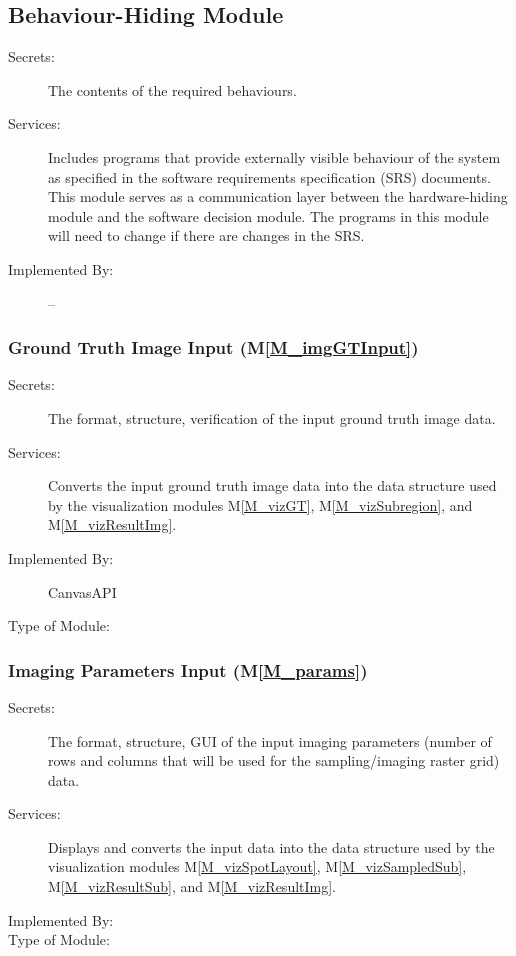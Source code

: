 \documentclass[12pt, titlepage]{article}
\newcommand{\mref}[1]{M\ref{#1}}
\begin{document}
\subsection{Behaviour-Hiding Module}

\begin{description}
\item[Secrets:]The contents of the required behaviours.
\item[Services:]Includes programs that provide externally visible behaviour of
  the system as specified in the software requirements specification (SRS)
  documents. This module serves as a communication layer between the
  hardware-hiding module and the software decision module. The programs in this
  module will need to change if there are changes in the SRS.
\item[Implemented By:] --
\end{description}


\subsubsection{Ground Truth Image Input (\mref{M_imgGTInput})}
\begin{description}
\item[Secrets:]The format, structure, verification of the input ground truth image data.
\item[Services:]Converts the input ground truth image data into the data structure used by the
  visualization modules \mref{M_vizGT}, \mref{M_vizSubregion}, and \mref{M_vizResultImg}.
\item[Implemented By:] CanvasAPI
\item[Type of Module:] 
\end{description}


\subsubsection{Imaging Parameters Input (\mref{M_params})}
\begin{description}
\item[Secrets:]The format, structure, GUI of the input imaging parameters (number
  of rows and columns that will be used for the sampling/imaging raster grid) data.
\item[Services:]Displays and converts the input data into the data structure used by the
  visualization modules \mref{M_vizSpotLayout}, \mref{M_vizSampledSub}, \mref{M_vizResultSub},
  and \mref{M_vizResultImg}.
\item[Implemented By:] \progname{}
\item[Type of Module:] 
\end{description}
\end{document}
